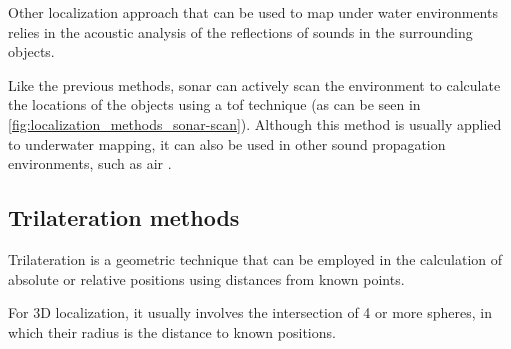 Other localization approach that can be used to map under water environments relies in the acoustic analysis of the reflections of sounds in the surrounding objects.

Like the previous methods, \gls{sonar} can actively scan the environment to calculate the locations of the objects using a \gls{tof} technique (as can be seen in \cref{fig:localization_methods_sonar-scan}). Although this method is usually applied to underwater mapping, it can also be used in other sound propagation environments, such as air \cite{Guarato2013}.


\subsection{Trilateration methods}

Trilateration is a geometric technique that can be employed in the calculation of absolute or relative positions using distances from known points.

For 3D localization, it usually involves the intersection of 4 or more spheres, in which their radius is the distance to known positions.

\paragraph{}


